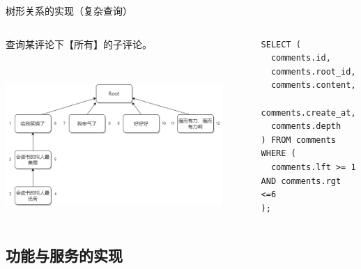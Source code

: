 \documentclass[UTF8]{ctexbeamer}
\begin{document}
\begin{frame}[fragile]{树形关系的实现（复杂查询）}
\begin{columns}
\begin{column}{0.5\textwidth}
查询某评论下【所有】的子评论。

~

\includegraphics[width=0.9\textwidth, keepaspectratio]{assets/insert_comment_after_update.png}
\end{column}
\begin{column}{0.45\textwidth}
\begin{verbatim}
SELECT (
  comments.id,
  comments.root_id,
  comments.content,
  comments.create_at,
  comments.depth
) FROM comments WHERE (
  comments.lft >= 1 AND comments.rgt <=6
);
\end{verbatim}
\end{column}
\end{columns}
\end{frame}

\subsection{功能与服务的实现}
\end{document}
